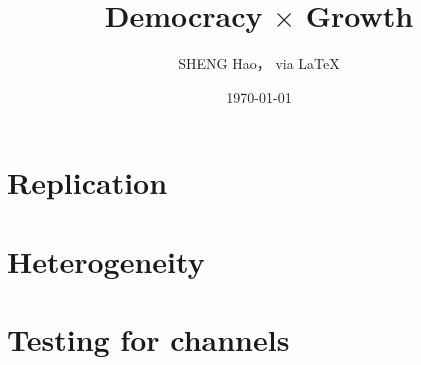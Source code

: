 \documentclass{article}
\begin{document}
\title{Democracy $\times$ Growth}   
\author{{\normalsize SHENG Hao， via \LaTeX}}
\date{\today}

\maketitle

\def \Pr{{\rm Pr}}
\baselineskip 0.6cm

\section{Replication}

\newpage
\section{Heterogeneity}

\newpage
\section{Testing for channels}









\end{document}
